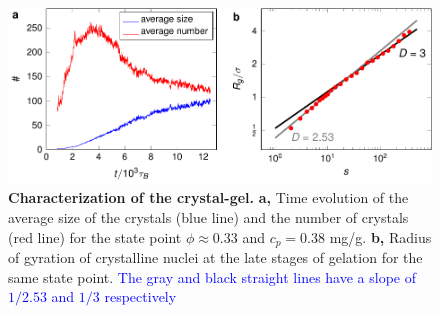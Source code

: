 \documentclass[preprint,amsmath,amssymb,superscriptaddress]{revtex4-1}
\begin{document}
\begin{figure}[!t]
 \centering
 \includegraphics{characterisation}
\caption{{\bf Characterization of the crystal-gel.} {\bf a,} Time evolution of the average size of the crystals (blue line) and the number of crystals (red line) for the state point $\phi\approx 0.33$ and $c_p=0.38$ mg/g. {\bf b,} Radius of gyration of crystalline nuclei at the late stages of gelation for the same state point. 
\textcolor{blue}{The gray and black straight lines have a slope of $1/2.53$ and $1/3$ respectively}} 
 \label{fig:crystals}
\end{figure}

\clearpage 
\end{document}
